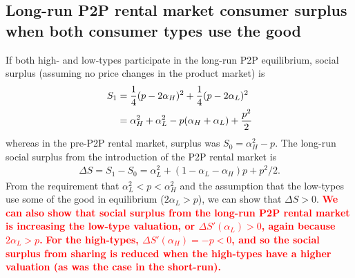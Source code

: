 \documentclass[11pt]{article}
\newcommand{\important}[1]{\textcolor{red}{\textbf{#1}}}
\newcommand{\important}[1]{#1}
\begin{document}
\subsection{Long-run P2P rental market consumer surplus when both consumer types use the good} 
If both high- and low-types participate in the long-run P2P equilibrium, social surplus (assuming no price changes in the product market) is 
\begin{align} 
S_1 & = \frac{1}{4}(p - 2\alpha_H)^2 + \frac{1}{4}(p - 2\alpha_L)^2 \notag \\
    & = \alpha_H^2 + \alpha_L^2 - p(\alpha_H + \alpha_L) + \frac{p^2}{2} \notag 
\end{align} 
whereas in the pre-P2P rental market, surplus was $S_0 = \alpha_H^2 - p$.  
The long-run social surplus from the introduction of the P2P rental market is  
\begin{align}
\Delta S = S_1 - S_0 = \alpha_L^2 + (1 - \alpha_L - \alpha_H)p + p^2/2.  
\end{align} 
From the requirement that $\alpha_L^2 < p < \alpha_H^2$ and the assumption that the low-types use some of the good in equilibrium ($2 \alpha_L > p$), we can show that $\Delta S > 0$. 
\important{We can also show that social surplus from the long-run P2P rental market is increasing the low-type valuation, or $\Delta S'(\alpha_L) > 0$, again because $2\alpha_L > p$.}
\important{For the high-types, $\Delta S'(\alpha_H) = -p < 0$, and so the social surplus from sharing is 
reduced when the high-types have a higher valuation (as was the case in the short-run).}

\end{document}
